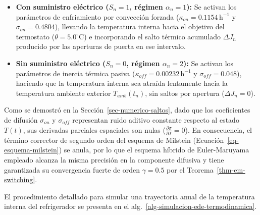 \documentclass[
  spanish,
  us-letterpaper,
]{scrreprt}
\providecommand{\tightlist}{%
  \setlength{\itemsep}{0pt}\setlength{\parskip}{0pt}}
\numberwithin{equation}{section}
\theoremstyle{plain}
\theoremstyle{plain}
\theoremstyle{plain}
\theoremstyle{definition}
\theoremstyle{remark}
\begin{document}
\begin{itemize}
\tightlist
\item
  \textbf{Con suministro eléctrico (\(S_n = 1\), régimen
  \(\alpha_n = 1\)):} Se activan los parámetros de enfriamiento por
  convección forzada (\(\kappa_{on} = 0.1154\,\text{h}^{-1}\) y
  \(\sigma_{on} = 0.4804\)), llevando la temperatura interna hacia el
  objetivo del termostato (\(\theta = 5.0^\circ\text{C}\)) e
  incorporando el salto térmico acumulado \(\Delta J_n\) producido por
  las aperturas de puerta en ese intervalo.
\item
  \textbf{Sin suministro eléctrico (\(S_n = 0\), régimen
  \(\alpha_n = 2\)):} Se activan los parámetros de inercia térmica
  pasiva (\(\kappa_{off} = 0.00232\,\text{h}^{-1}\) y
  \(\sigma_{off} = 0.048\)), haciendo que la temperatura interna sea
  atraída lentamente hacia la temperatura ambiente exterior
  \(T_{amb}(t_n)\), sin saltos por apertura (\(\Delta J_n = 0\)).
\end{itemize}

Como se demostró en la Sección~\ref{sec-numerico-saltos}, dado que los
coeficientes de difusión \(\sigma_{on}\) y \(\sigma_{off}\) representan
ruido aditivo constante respecto al estado \(T(t)\), sus derivadas
parciales espaciales son nulas
(\(\frac{\partial \sigma}{\partial T} = 0\)). En consecuencia, el
término corrector de segundo orden del esquema de Milstein
(Ecuación~\ref{eq-esquema-milstein}) se anula, por lo que el esquema
híbrido de Euler-Maruyama empleado alcanza la misma precisión en la
componente difusiva y tiene garantizada su convergencia fuerte de orden
\(\gamma = 0.5\) por el Teorema~\ref{thm-em-switching}.

El procedimiento detallado para simular una trayectoria anual de la
temperatura interna del refrigerador se presenta en el
alg.~\ref{alg-simulacion-ede-termodinamica}.
\end{document}
